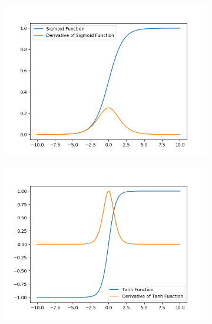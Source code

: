 \begin{figure}[h]
    \centering
    \begin{subfigure}[b]{0.49\textwidth}
        \includegraphics[width=\textwidth]{figures/dl/sigmoid.png}
        \label{fig:Sigmoid}
    \end{subfigure}
    \begin{subfigure}[b]{0.49\textwidth}
        \includegraphics[width=\textwidth]{figures/dl/tanh.png}
        \label{fig:Tanh}
    \end{subfigure}
    \begin{subfigure}[b]{0.49\textwidth}

\end{subfigure}
\end{figure}
